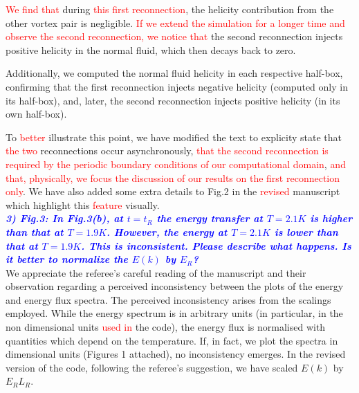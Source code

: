 \documentclass[a4paper,10pt]{article}
\def\red#1{\textcolor{red}{#1}}
\def\blue#1{\textcolor{blue}{#1}}
\def\refcomment#1{\textbf{\blue{\emph{#1}}}\\}
\begin{document}
\red{We find that} during \red{this first reconnection}, the helicity contribution
from the other vortex pair is negligible. \red{If we extend the
simulation for a longer time and observe the second reconnection,
we notice that} the second reconnection injects positive helicity 
in the normal fluid, which then decays back to zero.

Additionally, we computed the normal fluid helicity in each respective 
half-box, confirming that the first reconnection injects negative
helicity (computed only in its half-box), and, later, the second reconnection
injects positive helicity (in its own half-box). 

To \red{better} illustrate this point, we have modified the text to 
explicity state that \red{the two} reconnections occur 
asynchronously, \red{that the second reconnection is required by the
periodic boundary conditions of our computational domain}, 
\red{and that, physically, we focus the discussion of our results
on the first reconnection only}.
We have also added some extra details to Fig.2 in the \red{revised}
manuscript which highlight this \red{feature} visually. \\


    \refcomment{3) Fig.3: In Fig.3(b), at $t = t_R$ the energy transfer at $T = 2.1K$ is
    higher than that at $T = 1.9K$. However, the energy at $T = 2.1K$ is lower
    than that at $T = 1.9K$. This is inconsistent. Please describe what
    happens. Is it better to normalize the $E(k)$ by $E_R$?}

    We appreciate the referee’s careful reading of the manuscript and 
their observation regarding a perceived inconsistency between the plots of 
the energy and energy flux spectra. The perceived inconsistency arises 
from the scalings employed. While the energy spectrum is in arbitrary 
units (in particular, in the non dimensional units \red{used in} the code), 
the energy flux is normalised with quantities which depend on the temperature. 
If, in fact, we plot the spectra in dimensional units (Figures 1 attached),
no inconsistency emerges. In the revised version of the code, following 
the referee's suggestion, we have scaled $E(k)$ by $E_R L_R$.
    
\end{document}
